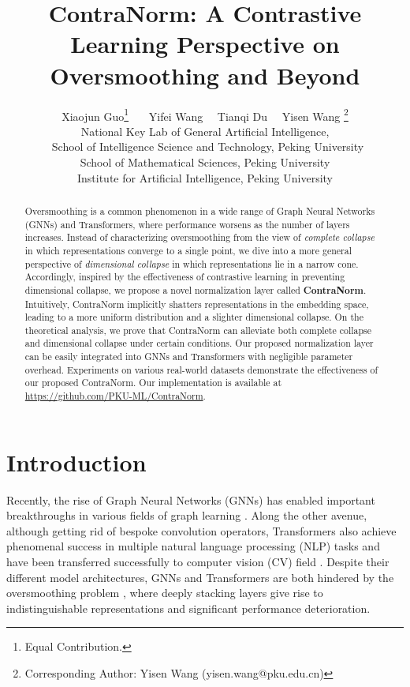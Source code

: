 \documentclass{article}
\title{ContraNorm: A Contrastive Learning Perspective on Oversmoothing and Beyond}
\author{Xiaojun Guo\thanks{Equal Contribution.}~~~ Yifei Wang~~ Tianqi Du~~ Yisen Wang \thanks{Corresponding Author: Yisen Wang (yisen.wang@pku.edu.cn)} \\
National Key Lab of General Artificial Intelligence,\\ \, School of Intelligence Science and Technology, Peking University\\
School of Mathematical Sciences, Peking University\\
Institute for Artificial Intelligence, Peking University
}
\theoremstyle{definition}
\theoremstyle{remark}
\theoremstyle{theorem}
\begin{document}
\maketitle


\begin{abstract}
Oversmoothing is a common phenomenon in a wide range of Graph Neural Networks (GNNs) and Transformers, where performance worsens as the number of layers increases. Instead of characterizing oversmoothing from the view of \textit{complete collapse} in which representations converge to a single point, we dive into a more general perspective of \textit{dimensional collapse} in which representations lie in a narrow cone. Accordingly, inspired by the effectiveness of contrastive learning in preventing dimensional collapse, we propose a novel normalization layer called \textbf{ContraNorm}. Intuitively, ContraNorm implicitly shatters representations in the embedding space, leading to a more uniform distribution and a slighter dimensional collapse. On the theoretical analysis, we prove that ContraNorm can alleviate both complete collapse and dimensional collapse under certain conditions. Our proposed normalization layer can be easily integrated into GNNs and Transformers with negligible parameter overhead. Experiments on various real-world datasets demonstrate the effectiveness of our proposed ContraNorm. Our implementation is available at \url{https://github.com/PKU-ML/ContraNorm}.
\end{abstract}

\section{Introduction}

Recently, the rise of Graph Neural Networks (GNNs) has enabled important breakthroughs in various fields of graph learning \citep{ying2018graph, senior2020improved}. Along the other avenue, although getting rid of bespoke convolution operators, Transformers \citep{vaswani2017attention} also achieve phenomenal success in multiple natural language processing (NLP) tasks \citep{lan2019albert, liu2019roberta, rajpurkar2018know} and have been transferred successfully to computer vision (CV) field \citep{dosovitskiy2020an, liu2021swin, strudel2021segmenter}. Despite their different model architectures, GNNs and Transformers are both hindered by the oversmoothing problem \citep{li2018deeper, tang2021augmented}, where deeply stacking layers give rise to indistinguishable representations and significant performance deterioration. 
\end{document}
